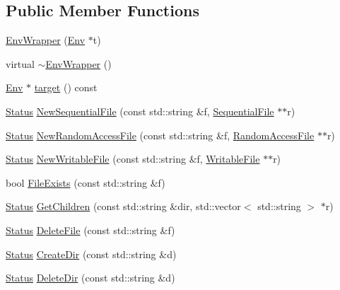 \subsection*{Public Member Functions}
\begin{DoxyCompactItemize}
\item 
\hyperlink{classleveldb_1_1_env_wrapper_a724d3740db2663034c8974c0378e49cb}{Env\+Wrapper} (\hyperlink{classleveldb_1_1_env}{Env} $\ast$t)
\item 
virtual \hyperlink{classleveldb_1_1_env_wrapper_a4bdf170510b585276e41671ae1910837}{$\sim$\+Env\+Wrapper} ()
\item 
\hyperlink{classleveldb_1_1_env}{Env} $\ast$ \hyperlink{classleveldb_1_1_env_wrapper_a7b147ba21760b3545e757abcdc6dd9c5}{target} () const 
\item 
\hyperlink{classleveldb_1_1_status}{Status} \hyperlink{classleveldb_1_1_env_wrapper_acd23f5803f7841cfcee9a29ffc1c5b04}{New\+Sequential\+File} (const std\+::string \&f, \hyperlink{classleveldb_1_1_sequential_file}{Sequential\+File} $\ast$$\ast$r)
\item 
\hyperlink{classleveldb_1_1_status}{Status} \hyperlink{classleveldb_1_1_env_wrapper_ab8c78959e0d52f3c1beeeffc11ca0a34}{New\+Random\+Access\+File} (const std\+::string \&f, \hyperlink{classleveldb_1_1_random_access_file}{Random\+Access\+File} $\ast$$\ast$r)
\item 
\hyperlink{classleveldb_1_1_status}{Status} \hyperlink{classleveldb_1_1_env_wrapper_a2d2b29a658e80c326ddaeb9c4d74c483}{New\+Writable\+File} (const std\+::string \&f, \hyperlink{classleveldb_1_1_writable_file}{Writable\+File} $\ast$$\ast$r)
\item 
bool \hyperlink{classleveldb_1_1_env_wrapper_ac72ceac6f4e2a6140e2835b2fa15f4df}{File\+Exists} (const std\+::string \&f)
\item 
\hyperlink{classleveldb_1_1_status}{Status} \hyperlink{classleveldb_1_1_env_wrapper_abb7c1fd7d91c80b6efcf9967154a18f3}{Get\+Children} (const std\+::string \&dir, std\+::vector$<$ std\+::string $>$ $\ast$r)
\item 
\hyperlink{classleveldb_1_1_status}{Status} \hyperlink{classleveldb_1_1_env_wrapper_af99d37829c3806a0e05979f5a7eb35af}{Delete\+File} (const std\+::string \&f)
\item 
\hyperlink{classleveldb_1_1_status}{Status} \hyperlink{classleveldb_1_1_env_wrapper_af8c26728d198a44627e08bb557ab4730}{Create\+Dir} (const std\+::string \&d)
\item 
\hyperlink{classleveldb_1_1_status}{Status} \hyperlink{classleveldb_1_1_env_wrapper_adedc51823cd8e4bdd55e4f10068f5d22}{Delete\+Dir} (const std\+::string \&d)
$$
\end{DoxyCompactItemize}

